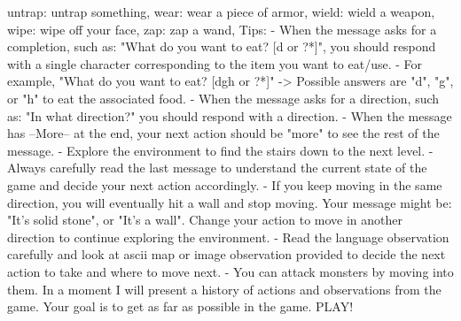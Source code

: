 {untrap: untrap something,\newline
wear: wear a piece of armor,\newline
wield: wield a weapon,\newline
wipe: wipe off your face,\newline
zap: zap a wand,\newline
\newline
Tips:\newline
- When the message asks for a completion, such as: "What do you want to eat? [d or ?*]", you should respond with a single character corresponding to the item you want to eat/use.\newline
    - For example, "What do you want to eat? [dgh or ?*]" -> Possible answers are "d", "g", or "h" to eat the associated food.\newline
- When the message asks for a direction, such as: "In what direction?" you should respond with a direction.\newline
- When the message has --More-- at the end, your next action should be "more" to see the rest of the message.\newline
- Explore the environment to find the stairs down to the next level.\newline
- Always carefully read the last message to understand the current state of the game and decide your next action accordingly.\newline
- If you keep moving in the same direction, you will eventually hit a wall and stop moving. Your message might be: "It's solid stone", or "It's a wall". Change your action to move in another direction to continue exploring the environment.\newline
- Read the language observation carefully and look at ascii map or image observation provided to decide the next action to take and where to move next.\newline
- You can attack monsters by moving into them.\newline\newline
In a moment I will present a history of actions and observations from the game.\newline
Your goal is to get as far as possible in the game.\newline\newline
PLAY!
}

